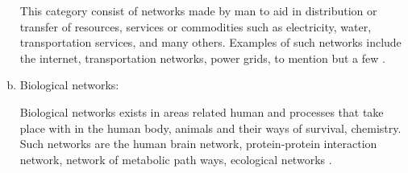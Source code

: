 \documentclass[10pt,a4paper]{article}
\begin{document}
\begin{enumerate}[a.]
	This category consist of networks made by man to aid in distribution or transfer of resources, services or commodities such as electricity, water, transportation services, and many others. Examples of such networks include the internet, transportation networks, power grids, to mention but a few \citep{faloutsos1999power,pagani2013power,banavar1999size}.
	\item Biological networks: 
	
	Biological networks exists in areas related human and processes that take place with in the human body, animals and their ways of survival, chemistry. Such networks are the human brain network, protein-protein interaction network, network of metabolic path ways, ecological networks \citep{estrada2011structure,sporns2004organization,schwikowski2000network}.
\end{enumerate}
\end{document}
